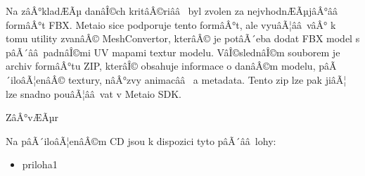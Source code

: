 \documentclass[twoside,12pt]{article}
\begin{document}
Na zâÂ°kladÆÃµ danâÎ©ch kritâÂ©riââ  byl zvolen za nejvhodnÆÃµjâÂ°ââ  formâÂ°t FBX. Metaio sice podporuje tento formâÂ°t, ale vyuâÃ¦ââ vâÂ° k tomu utility zvanâÂ© MeshConvertor, kterâÂ© je potâÃ´eba dodat FBX model s pâÃ´ââ padnâÎ©mi UV mapami textur modelu. VâÎ©slednâÎ©m souborem je archiv formâÂ°tu ZIP, kterâÎ© obsahuje informace o danâÂ©m modelu, pâÃ´iloâÃ¦enâÂ© textury, nâÂ°zvy animacââ  a metadata. Tento zip lze pak jiâÃ¦ lze snadno pouâÃ¦ââ vat v Metaio SDK.


% 
\newpage


% 
\newpage

%
%
ZâÂ°vÆÃµr

%

%
%
Na pâÃ´iloâÃ¦enâÂ©m CD jsou k dispozici tyto pâÃ´ââ lohy: 
\begin{itemize}
\item priloha1
\end{itemize}
\end{document}
